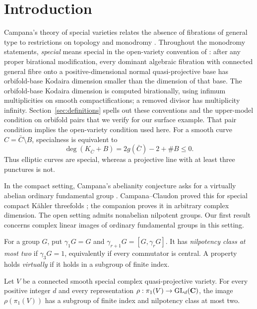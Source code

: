 \section{Introduction}\label{sec:introduction}

Campana's theory of special varieties relates the absence of fibrations
of general type to restrictions on topology and monodromy
\cite{Campana2004,Campana2011}. Throughout the monodromy statements,
\emph{special} means special in the open-variety convention of
\cite[Definition 2.1]{CDY2025}: after any proper birational modification,
every dominant algebraic fibration with connected general fibre onto a
positive-dimensional normal quasi-projective base has orbifold-base
Kodaira dimension smaller
than the dimension of that base. The orbifold-base Kodaira dimension is
computed birationally,
using infimum multiplicities on smooth compactifications; a removed
divisor has multiplicity infinity. Section~\ref{sec:definitions}
spells out these conventions and the upper-model condition on orbifold
pairs that we verify for our surface example. That pair condition
implies the open-variety condition used here. For a smooth curve
$C=\bar C\setminus B$, specialness is equivalent to
\[
 \deg(K_{\bar C}+B)=2g(\bar C)-2+\#B\leq0.
\]
Thus elliptic curves are special, whereas a projective line with
at least three punctures is not.

In the compact setting, Campana's abelianity conjecture asks for a
virtually abelian ordinary fundamental group
\cite[Conjecture 7.1, p.~595]{Campana2004}. Campana--Claudon proved this
for special compact K\"ahler threefolds
\cite[Theorem 1.3]{CampanaClaudon2014}; the companion
\cite[Theorem 1.1]{OpenAICompactAbelianity2026} proves it in arbitrary
complex dimension. The open setting admits nonabelian nilpotent groups.
Our first result concerns complex linear images of ordinary fundamental
groups in this setting.

For a group $G$, put $\gamma_1G=G$ and
$\gamma_{r+1}G=[G,\gamma_rG]$. It has \emph{nilpotency class at most two}
if $\gamma_3G=1$, equivalently if every commutator is central. A property
holds \emph{virtually} if it holds in a subgroup of finite index.

\begin{theorem}\label{thm:linear}
Let $V$ be a connected smooth special complex quasi-projective variety.
For every positive integer $d$ and every representation
$\rho:\pi_1(V)\to\operatorname{GL}_d(\mathbf C)$, the image $\rho(\pi_1(V))$ has a subgroup
of finite index and nilpotency class at most two.
\end{theorem}

